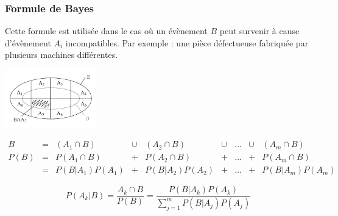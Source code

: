 \subsubsection{Formule de Bayes}
Cette formule est utilisée dans le cas où un évènement $B$ peut survenir à cause d'évènement $A_i$ incompatibles. Par exemple : une pièce défectueuse fabriquée par plusieurs machines différentes.
\begin{center}
	\includegraphics[width=0.3\textwidth]{images/formule-de-bayes} 
\end{center}
\begin{center}
	$\begin{array}{CCCCCCCCC}
		B    & = & (A_1 \cap B)      & \cup & (A_2 \cap B)      & \cup & \dots & \cup & (A_m \cap B)\\
		P(B) & = & P(A_1 \cap B)     & +    & P(A_2 \cap B)     & +    & \dots & +    & P(A_m \cap B)\\
		     & = & P(B | A_1) P(A_1) & +    & P(B |A_2) P(A_2) & +    & \dots & +    & P(B |A_m) P(A_m)
	\end{array}$
\end{center}

$$\boxed{P(A_k|B)=\frac{A_k \cap B}{P(B)}=\frac{P(B|A_k)P(A_k)}{\displaystyle\sum_{j=1}^{m}P(B|A_j)P(A_j)}}$$